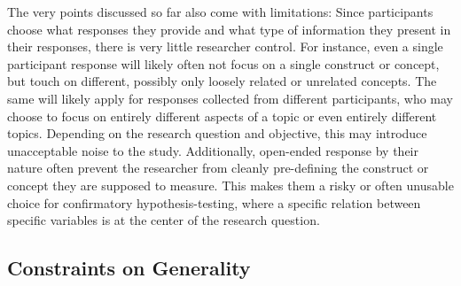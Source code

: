 \documentclass[man,floatsintext]{apa7}
\newcommand{\change}[1]{#1}
\begin{document}
\change{The very points discussed so far also come with limitations:} Since participants choose what responses they provide and what type of information they present in their responses, there is very little researcher control. For instance, even a single participant response will likely often not focus on a single construct or concept, but touch on different, possibly only loosely related or unrelated concepts. The same will likely apply for responses collected from different participants, who may choose to focus on entirely different aspects of a topic or even entirely different topics. Depending on the research question and objective, this may introduce unacceptable noise to the study. Additionally, open-ended response by their nature often prevent the researcher from cleanly pre-defining the construct or concept they are supposed to measure. This makes them a risky or often unusable choice for confirmatory hypothesis-testing, where a specific relation between specific variables is at the center of the research question.

\subsection{Constraints on Generality}
\end{document}
